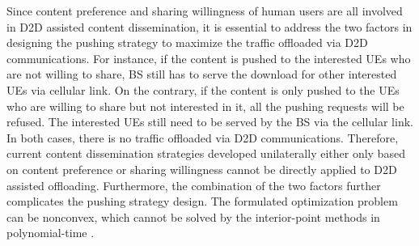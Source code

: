 \documentclass[12pt, draftclsnofoot, onecolumn]{IEEEtran}
\begin{document}
Since content preference and sharing willingness of human users are all involved in D2D assisted content dissemination, it is essential to address the two factors in designing the pushing strategy to maximize the traffic offloaded via D2D communications. For instance, if the content is pushed to the interested UEs who are not willing to share, BS still has to serve the download for other interested UEs via cellular link. On the contrary, if the content is only pushed to the UEs who are willing to share but not interested in it, all the pushing requests will be refused. The interested UEs still need to be served by the BS via the cellular link. In both cases, there is no traffic offloaded via D2D communications. Therefore, current content dissemination strategies developed unilaterally either only based on content preference or sharing willingness cannot be directly applied to D2D assisted offloading.
Furthermore, the combination of the two factors further complicates the pushing strategy design.
The formulated optimization problem can be nonconvex, which cannot be solved by the interior-point methods in polynomial-time \cite{boyd2004convex}.
\end{document}
